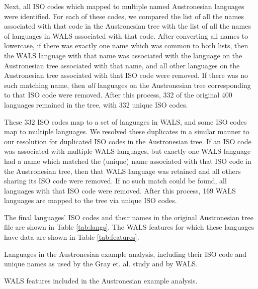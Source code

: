 \documentclass[10pt,a4paper]{article}
\begin{document}
Next, all ISO codes which mapped to multiple named Austronesian languages were identified.  For each of these codes, we compared the list of all the names associated with that code in the Austronesian tree with the list of all the names of languages in WALS associated with that code.  After converting all names to lowercase, if there was exactly one name which was common to both lists, then the WALS language with that name was associated with the language on the Austronesian tree associated with that name, and all other languages on the Austronesian tree associated with that ISO code were removed.  If there was no such matching name, then \emph{all} languages on the Austronesian tree corresponding to that ISO code were removed.  After this process, 332 of the original 400 languages remained in the tree, with 332 unique ISO codes.

These 332 ISO codes map to a set of languages in WALS, and some ISO codes map to multiple languages.  We resolved these duplicates in a similar manner to our resolution for duplicated ISO codes in the Austronesian tree.  If an ISO code was associated with multiple WALS languages, but exactly one WALS language had a name which matched the (unique) name associated with that ISO code in the Austronesian tree, then that WALS language was retained and all others sharing its ISO code were removed.  If no such match could be found, all languages with that ISO code were removed.  After this process, 169 WALS languages are mapped to the tree via unique ISO codes.

The final languages' ISO codes and their names in the original Austronesian tree file are shown in Table \ref{tab:langs}.  The WALS features for which these languages have data are shown in Table \ref{tab:features}.

\begin{table}[]
	\begin{center}
	\tiny
	
	\end{center}
	\caption{Languages in the Austronesian example analysis, including their ISO code and unique names as used by the Gray et. al. study and by WALS.}
\label{tab:langs}
\end{table}

\begin{table}[ht]
	\begin{center}
		
	\end{center}
\caption{WALS features included in the Austronesian example analysis.}
\label{tab:features}
\end{table}
\end{document}
